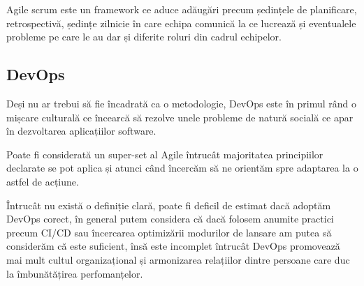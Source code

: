 Agile scrum este un framework ce aduce adăugări precum ședințele de planificare,
retrospectivă, ședințe zilnicie în care echipa comunică la ce lucrează și
eventualele probleme pe care le au dar și diferite roluri din cadrul echipelor.

\subsection{DevOps}

Deși nu ar trebui să fie încadrată ca o metodologie, DevOps este în primul
rând o mișcare culturală ce încearcă să rezolve unele probleme de natură
socială ce apar în dezvoltarea aplicațiilor software.

Poate fi considerată un super-set al Agile întrucât majoritatea principiilor
declarate se pot aplica și atunci când încercăm să ne orientăm spre adaptarea
la o astfel de acțiune.

Întrucât nu există o definiție clară, poate fi deficil de estimat dacă
adoptăm DevOps corect, în general putem considera că dacă folosem anumite
practici precum CI/CD sau încercarea optimizării modurilor de lansare am putea
să considerăm că este suficient, însă este incomplet întrucât DevOps
promovează mai mult cultul organizațional și armonizarea relațiilor dintre
persoane care duc la îmbunătățirea perfomanțelor.
